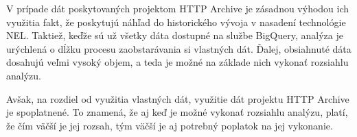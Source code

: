 V prípade dát poskytovaných projektom HTTP Archive je zásadnou výhodou ich využitia fakt, že poskytujú náhľad do historického vývoja v nasadení technológie NEL.
Taktiež, keďže sú už všetky dáta dostupné na službe BigQuery, analýza je urýchlená o dĺžku procesu zaobstarávania si vlastných dát.
Ďalej, obsiahnuté dáta dosahujú veľmi vysoký objem, a teda je možné na základe nich vykonať rozsiahlu analýzu.

Avšak, na rozdiel od využitia vlastných dát, využitie dát projektu HTTP Archive je spoplatnené.
To znamená, že aj keď je možné vykonať rozsiahlu analýzu, platí, že čím väčší je jej rozsah, tým väčší je aj potrebný poplatok na jej vykonanie.